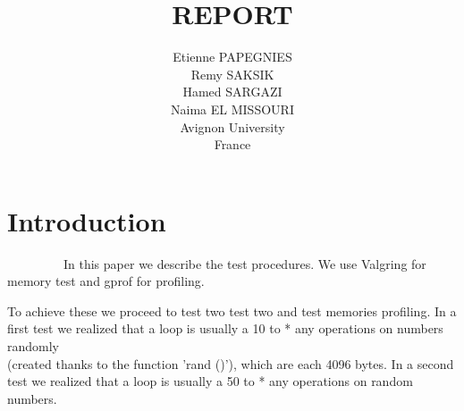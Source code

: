 \documentclass[11pt]{report}
\begin{document}
    \title{REPORT}
    \author { 
    Etienne PAPEGNIES\\
    Remy SAKSIK\\
    Hamed SARGAZI\\
    Naima EL MISSOURI\\
    Avignon University\\
    France\\
}
   \maketitle

\setcounter{secnumdepth}{1}



    \tableofcontents
    
   \chapter*{Introduction}  
   
~~~~~~~~~In this paper we describe the test procedures.
 We use Valgring for memory test and gprof for profiling.

To achieve these we proceed to test two test two and test memories profiling.
In a first test we realized that a loop is usually a 10 to * any operations on numbers randomly \\
(created thanks to the function 'rand ()'), which are each 4096 bytes.
In a second test we realized that a loop is usually a 50 to * any operations on random numbers.
\end{document}
